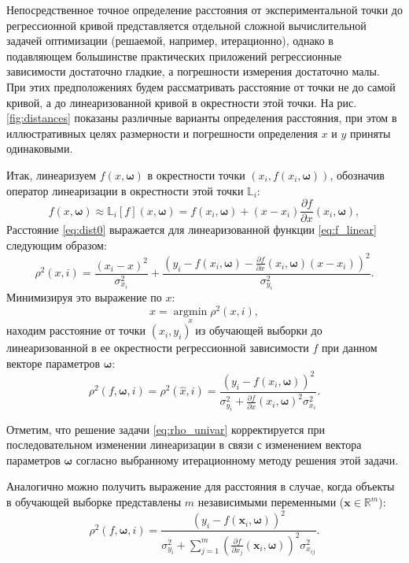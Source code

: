 \documentclass[tikz,10pt,a4paper]{article}
\newcommand{\bomega}{\boldsymbol{\omega}}
\begin{document}
Непосредственное точное определение расстояния от экспериментальной
точки до регрессионной кривой представляется отдельной
сложной вычислительной задачей
оптимизации (решаемой, например, итерационно),
однако в подавляющем большинстве
практических приложений регрессионные зависимости достаточно
гладкие, а погрешности измерения достаточно малы. При этих предположениях
будем рассматривать расстояние от точки не до самой кривой, а до
линеаризованной кривой в окрестности этой точки. На рис. \ref{fig:distances}
показаны различные варианты определения расстояния, при этом
в иллюстративных целях размерности и погрешности определения $x$ и $y$ приняты
одинаковыми.

Итак, линеаризуем $f(x, \bomega)$ в окрестности точки $(x_i, f(x_i, \bomega))$,
обозначив оператор линеаризации в окрестности этой точки $\mathbb{L}_i$:
\begin{equation}
  f(x, \bomega) \approx \mathbb{L}_{i}[f](x, \bomega) = f(x_i, \bomega) + (x - x_i) \frac{\partial f}{\partial x}(x_i, \bomega),
  \label{eq:f_linear}
\end{equation}
Расстояние \eqref{eq:dist0} выражается для линеаризованной функции
\eqref{eq:f_linear} следующим образом:
\begin{equation}
  \rho^2(x, i) = \frac{(x_i - x)^2}{\sigma_{x_i}^2} + \frac{(y_i - f(x_i, \bomega) - \frac{\partial f}{\partial x}(x_i, \bomega) (x - x_i))^2}{\sigma_{y_i}^2}.
  \label{eq:dist_linear}
\end{equation}
Минимизируя это выражение по $x$:
\[
  \hat{x} = \mathop{\arg \min}\limits_x \rho^2(x, i),
\]
находим расстояние от точки $(x_i, y_i)$ из обучающей выборки до
линеаризованной в ее окрестности регрессионной зависимости $f$ при
данном векторе параметров $\bomega$:
\begin{equation}
  \rho^2(f, \bomega, i) = \rho^2(\hat{x}, i) = \frac{(y_i - f(x_i, \bomega))^2}{\sigma^2_{y_i} + \frac{\partial f}{\partial x}(x_i, \bomega)^2 \sigma^2_{x_i}}.
  \label{eq:rho_univar}
\end{equation}

Отметим, что решение задачи \eqref{eq:rho_univar} корректируется при
последовательном изменении линеаризации в связи с изменением вектора
параметров $\bomega$ согласно выбранному итерационному методу решения
этой задачи.

Аналогично можно получить выражение для расстояния в случае, когда объекты в обучающей выборке
представлены $m$ независимыми переменными ($\mathbf{x} \in \mathbb{R}^m$):
\[
  \rho^2(f, \bomega, i) = \frac{(y_i - f(\mathbf{x}_i, \bomega))^2}{\sigma_{y_i}^2 + \sum_{j = 1}^m (\frac{\partial f}{\partial x_j}(\mathbf{x}_i, \bomega))^2 \sigma^2_{x_{ij}}}.
\]
\end{document}
